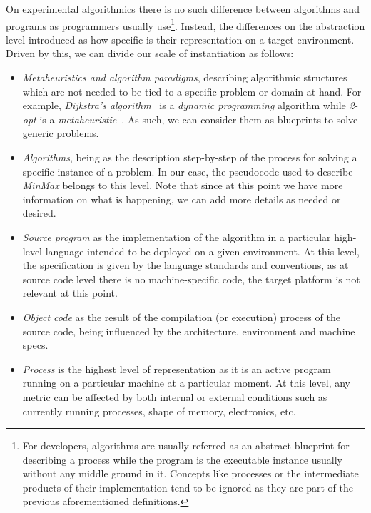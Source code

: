 On experimental algorithmics there is no such difference between algorithms and programs as programmers usually use\footnote{For developers, algorithms are usually referred as an abstract blueprint for describing a process while the program is the executable instance usually without any middle ground in it. Concepts like processes or the intermediate products of their implementation tend to be ignored as they are part of the previous aforementioned definitions.}. Instead, the differences on the abstraction level introduced as how specific is their representation on a target environment. Driven by this, we can divide our scale of instantiation as follows:\\

\begin{itemize}
    \item \textit{Metaheuristics and algorithm paradigms}, describing algorithmic structures which are not needed to be tied to a specific problem or domain at hand. For example, \textit{Dijkstra's algorithm}~\cite{10.5555/1614191} is a \emph{dynamic programming} algorithm while \textit{2-opt} is a \emph{metaheuristic}~\cite{10.2307/167074}. As such, we can consider them as blueprints to solve generic problems.
    \item \textit{Algorithms}, being as the description step-by-step of the process for solving a specific instance of a problem. In our case, the pseudocode used to describe \textit{MinMax} belongs to this level. Note that since at this point we have more information on what is happening, we can add more details as needed or desired.
    \item \textit{Source program} as the implementation of the algorithm in a particular high-level language intended to be deployed on a given environment. At this level, the specification is given by the language standards and conventions, as at source code level there is no machine-specific code, the target platform is not relevant at this point.
    \item \textit{Object code} as the result of the compilation (or execution) process of the source code, being influenced by the architecture, environment and machine specs.
    \item \textit{Process} is the highest level of representation as it is an active program running on a particular machine at a particular moment. At this level, any metric can be affected by both internal or external conditions such as currently running processes, shape of memory, electronics, etc.
\end{itemize}

